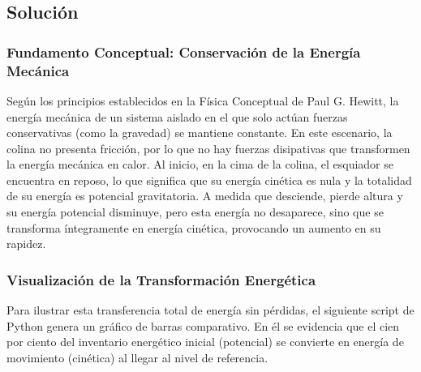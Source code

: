 \documentclass[12pt,a4paper]{article}
\begin{document}
\begin{center}
\end{center}

\subsection*{Solución}

\subsubsection*{Fundamento Conceptual: Conservación de la Energía Mecánica}
Según los principios establecidos en la Física Conceptual de Paul G. Hewitt, la energía mecánica de un sistema aislado en el que solo actúan fuerzas conservativas (como la gravedad) se mantiene constante. En este escenario, la colina no presenta fricción, por lo que no hay fuerzas disipativas que transformen la energía mecánica en calor. Al inicio, en la cima de la colina, el esquiador se encuentra en reposo, lo que significa que su energía cinética es nula y la totalidad de su energía es potencial gravitatoria. A medida que desciende, pierde altura y su energía potencial disminuye, pero esta energía no desaparece, sino que se transforma íntegramente en energía cinética, provocando un aumento en su rapidez.

\subsubsection*{Visualización de la Transformación Energética}
Para ilustrar esta transferencia total de energía sin pérdidas, el siguiente script de Python genera un gráfico de barras comparativo. En él se evidencia que el cien por ciento del inventario energético inicial (potencial) se convierte en energía de movimiento (cinética) al llegar al nivel de referencia.
\end{document}
